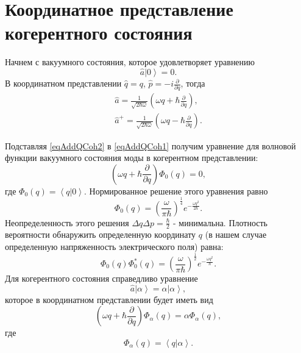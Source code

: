 \section{Координатное представление когерентного состояния}
\label{AddQCoh}
Начнем с вакуумного состояния, которое удовлетворяет уравнению 
\begin{equation}
\hat{a}\left|0\right> = 0.
\label{eqAddQCoh1}
\end{equation}
В координатном представлении $\hat{q} = q$, $\hat{p} = -i
\frac{\partial}{\partial q}$, тогда
\begin{eqnarray}
\hat{a} = \frac{1}{\sqrt{2 \hbar \omega}}
\left(
\omega q + \hbar \frac{\partial}{\partial q}
\right),
\nonumber \\
\hat{a}^{+} = \frac{1}{\sqrt{2 \hbar \omega}}
\left(
\omega q - \hbar \frac{\partial}{\partial q}
\right).
\label{eqAddQCoh2}
\end{eqnarray}

Подставляя \eqref{eqAddQCoh2} в \eqref{eqAddQCoh1} получим уравнение
для волновой функции вакуумного состояния моды в когерентном
представлении:
\begin{equation}
\left(
\omega q + \hbar \frac{\partial}{\partial q}
\right) \Phi_0\left(q\right) = 0,
\label{eqAddQCoh3}
\end{equation}
где $\Phi_0\left(q\right) = \left<q\right|\left.0\right>$.
Нормированное решение этого уравнения равно
\begin{equation}
\Phi_0\left(q\right) = \left(\frac{\omega}{\pi
  \hbar}\right)^{\frac{1}{4}} e^{-\frac{\omega q^2}{2 \hbar}}.
\nonumber
\end{equation}
Неопределенность этого решения $\Delta q \Delta p =
\frac{\hbar}{2}$ - минимальна. Плотность вероятности обнаружить
определенную координату $q$ (в нашем случае определенную напряженность
электрического поля) равна:
\begin{equation}
\Phi_0\left(q\right)\Phi_0^{*}\left(q\right) = \left(\frac{\omega}{\pi
  \hbar}\right)^{\frac{1}{2}} e^{-\frac{\omega q^2}{\hbar}}.
\label{eqAddQCoh4}
\end{equation}
Для когерентного состояния справедливо уравнение
\[
\hat{a}\left|\alpha\right> = \alpha \left|\alpha\right>,
\]
которое в координатном представлении будет иметь вид
\begin{equation}
\left(
\omega q + \hbar \frac{\partial}{\partial q}
\right) \Phi_{\alpha}\left(q\right) = 
\alpha \Phi_{\alpha}\left(q\right),
\label{eqAddQCoh5}
\end{equation}
где 
\[
\Phi_{\alpha}\left(q\right) = \left<q\right|\left.\alpha\right>.
\]

